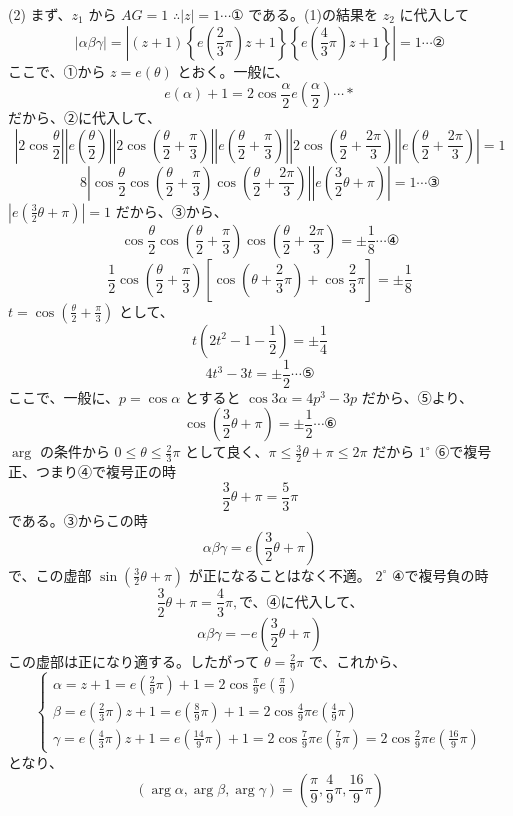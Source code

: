 \documentclass[../main.tex]{subfiles}
\begin{document}
(2) まず、$z_1$ から $AG = 1$ $\therefore |z| = 1 \cdots \text{①}$ である。(1)の結果を $z_2$ に代入して
$$ |\alpha \beta \gamma| = \left| (z+1) \left\{ e\left(\frac{2}{3}\pi\right)z + 1 \right\} \left\{ e\left(\frac{4}{3}\pi\right)z + 1 \right\} \right| = 1 \cdots \text{②} $$
ここで、①から $z = e(\theta)$ とおく。一般に、
$$ e(\alpha) + 1 = 2 \cos \frac{\alpha}{2} e\left(\frac{\alpha}{2}\right) \cdots * $$
だから、②に代入して、
$$ \left| 2 \cos \frac{\theta}{2} \right| \left| e\left(\frac{\theta}{2}\right) \right| \left| 2 \cos \left(\frac{\theta}{2} + \frac{\pi}{3}\right) \right| \left| e\left(\frac{\theta}{2} + \frac{\pi}{3}\right) \right| \left| 2 \cos \left(\frac{\theta}{2} + \frac{2\pi}{3}\right) \right| \left| e\left(\frac{\theta}{2} + \frac{2\pi}{3}\right) \right| = 1 $$
$$ 8 \left| \cos \frac{\theta}{2} \cos \left(\frac{\theta}{2} + \frac{\pi}{3}\right) \cos \left(\frac{\theta}{2} + \frac{2\pi}{3}\right) \right| \left| e\left(\frac{3}{2}\theta + \pi\right) \right| = 1 \cdots \text{③} $$
$|e(\frac{3}{2}\theta + \pi)| = 1$ だから、③から、
$$ \cos \frac{\theta}{2} \cos \left(\frac{\theta}{2} + \frac{\pi}{3}\right) \cos \left(\frac{\theta}{2} + \frac{2\pi}{3}\right) = \pm \frac{1}{8} \cdots \text{④} $$
$$ \frac{1}{2} \cos \left(\frac{\theta}{2} + \frac{\pi}{3}\right) \left[ \cos \left(\theta + \frac{2}{3}\pi\right) + \cos \frac{2}{3}\pi \right] = \pm \frac{1}{8} $$
$t = \cos(\frac{\theta}{2} + \frac{\pi}{3})$ として、
$$ t(2t^2 - 1 - \frac{1}{2}) = \pm \frac{1}{4} $$
$$ 4t^3 - 3t = \pm \frac{1}{2} \cdots \text{⑤} $$
ここで、一般に、$p = \cos \alpha$ とすると $\cos 3\alpha = 4p^3 - 3p$ だから、⑤より、
$$ \cos \left(\frac{3}{2}\theta + \pi\right) = \pm \frac{1}{2} \cdots \text{⑥} $$
$\arg$ の条件から $0 \le \theta \le \frac{2}{3}\pi$ として良く、$\pi \le \frac{3}{2}\theta + \pi \le 2\pi$ だから
$1^\circ$ ⑥で複号正、つまり④で複号正の時
$$ \frac{3}{2}\theta + \pi = \frac{5}{3}\pi $$
である。③からこの時
$$ \alpha \beta \gamma = e\left(\frac{3}{2}\theta + \pi\right) $$
で、この虚部 $\sin(\frac{3}{2}\theta + \pi)$ が正になることはなく不適。
$2^\circ$ ④で複号負の時
$$ \frac{3}{2}\theta + \pi = \frac{4}{3}\pi, \text{で、④に代入して、} $$
$$ \alpha \beta \gamma = -e\left(\frac{3}{2}\theta + \pi\right) $$
この虚部は正になり適する。したがって $\theta = \frac{2}{9}\pi$ で、これから、
$$
\begin{cases} \alpha = z + 1 = e\left(\frac{2}{9}\pi\right) + 1 = 2 \cos \frac{\pi}{9} e\left(\frac{\pi}{9}\right) \\ \beta = e\left(\frac{2}{3}\pi\right) z + 1 = e\left(\frac{8}{9}\pi\right) + 1 = 2 \cos \frac{4}{9}\pi e\left(\frac{4}{9}\pi\right) \\ \gamma = e\left(\frac{4}{3}\pi\right) z + 1 = e\left(\frac{14}{9}\pi\right) + 1 = 2 \cos \frac{7}{9}\pi e\left(\frac{7}{9}\pi\right) = 2 \cos \frac{2}{9}\pi e\left(\frac{16}{9}\pi\right)
\end{cases} $$
となり、
$$ (\arg \alpha, \arg \beta, \arg \gamma) = \left( \frac{\pi}{9}, \frac{4}{9}\pi, \frac{16}{9}\pi \right) $$
\end{document}
